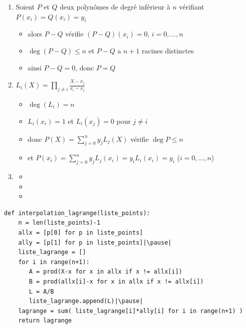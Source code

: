  \begin{frame}
\begin{enumerate}
  \item Soient $P$ et $Q$ deux polynômes de degré inférieur à $n$ vérifiant
   $P(x_i)=Q(x_i)=y_i$
   \pause
   \begin{itemize}
     \item alors $P-Q$ vérifie $(P-Q)(x_i)=0$, $i=0,\ldots,n$ 
     \pause
     \item $\deg(P-Q)\leq n$ et $P-Q$ a $n+1$ racines distinctes 
     \pause
     \item ainsi $P-Q=0$, donc $P=Q$
   \end{itemize}
  
  \bigskip
  \pause
  \item $L_i(X) = \displaystyle \prod_{j \neq i} \frac{X-x_j}{x_i-x_j}$
  \pause
  \begin{itemize}
    \item $\deg(L_i)=n$ 
    \pause  
    \item $L_i(x_i) = 1$  et $L_i(x_j)=0$ pour $j\neq i$ 
    \pause  
    \item donc $P(X) = \sum_{j=0}^{n} y_j L_j(X)$ vérifie $\deg P \leq n$ 
    \pause
    \item et $P(x_i)= \sum_{j=0}^{n} y_j L_j(x_i) = y_iL_i(x_i) = y_i$ ($i=0,\ldots,n$)
  \end{itemize}  
  
  \bigskip   
  \pause 
   
  \item 
  \begin{itemize}
    \item {}
    \pause   
    \item {}
    \pause
    \item {} 
  \end{itemize}
  \end{enumerate}
 \end{frame}


\begin{frame}[fragile]
\begin{algo}
\begin{lstlisting}
def interpolation_lagrange(liste_points):
    n = len(liste_points)-1
    allx = [p[0] for p in liste_points]
    ally = [p[1] for p in liste_points]|\pause|
    liste_lagrange = []    
    for i in range(n+1):
       A = prod(X-x for x in allx if x != allx[i])        
       B = prod(allx[i]-x for x in allx if x != allx[i])
       L = A/B
       liste_lagrange.append(L)|\pause|   
    lagrange = sum( liste_lagrange[i]*ally[i] for i in range(n+1) )
    return lagrange
\end{lstlisting}
\end{algo}

\end{frame}

